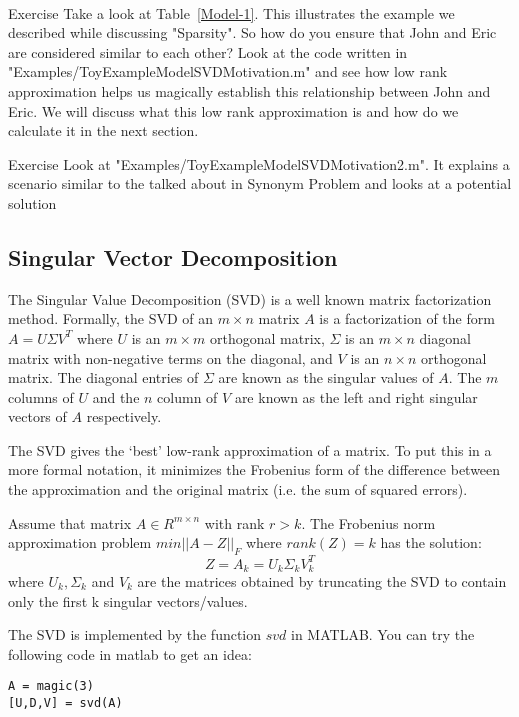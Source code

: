 \\
\begin{myremark}{Exercise }
Take a look at Table~\ref{Model-1}. This illustrates the example we described while discussing "Sparsity". So how do you ensure that John and Eric are considered similar to each other? Look at the code written in "Examples/ToyExampleModelSVDMotivation.m" and see how low rank approximation helps us magically establish this relationship between John and Eric. We will discuss what this low rank approximation is and how do we calculate it in the next section. 
\end{myremark}

\begin{myremark}{Exercise }
Look at "Examples/ToyExampleModelSVDMotivation2.m". It explains a scenario similar to the talked about in Synonym Problem and looks at a potential solution 
\end{myremark}
  \subsection{Singular Vector Decomposition}

The Singular Value Decomposition (SVD) is a well known matrix factorization method. Formally, the SVD of an $m \times n$ matrix $A$ is a factorization of the form $A = U \Sigma V^{T}$ where $U$ is an $m \times m$ orthogonal matrix, $\Sigma$ is an $m \times n$ diagonal matrix with non-negative terms on the diagonal, and $V$ is an $n \times n$ orthogonal matrix. The diagonal entries of $\Sigma$ are known as the singular values of $A$. The $m$ columns of $U$ and the $n$ column of $V$ are known as the left and right singular vectors of $A$ respectively. 

The SVD gives the `best' low-rank approximation of a matrix. To put this in a more formal notation, it minimizes the Frobenius form of the difference between the approximation and the original matrix (i.e. the sum of squared errors).

Assume that matrix $A \in R^{m \times n}$ with rank $r > k$. The Frobenius norm approximation problem $min || A - Z ||_{F}$ where $rank(Z) = k$ has the solution:
\[Z = A_{k} = U_{k} \Sigma_{k} V_{k}^{T}\]
where $U_{k}, \Sigma_{k}$ and $V_{k}$ are the matrices obtained by truncating the SVD to contain only the first k singular vectors/values.

The SVD is implemented by the function $svd$ in MATLAB. You can try the following code in matlab to get an idea:
\begin{verbatim}
A = magic(3)
[U,D,V] = svd(A)
\end{verbatim}

